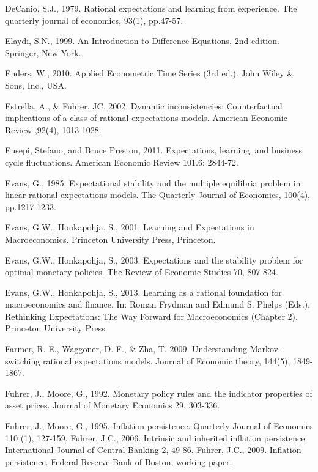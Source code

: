 \begin{thebibliography}{}
\bibitem{} DeCanio, S.J., 1979. Rational expectations and learning from experience. The quarterly journal of economics, 93(1), pp.47-57.

 Elaydi, S.N., 1999. An Introduction to Difference
Equations, 2nd edition. Springer, New York.

Enders, W., 2010. Applied Econometric Time Series (3rd ed.). John Wiley \& Sons, Inc., USA.

 Estrella, A., \& Fuhrer, JC, 2002.
Dynamic inconsistencies: Counterfactual implications of a class of rational-expectations models. 
{American Economic Review} ,92(4), 1013-1028.

 Eusepi, Stefano, and Bruce Preston, 2011.
Expectations, learning, and business cycle fluctuations. {American Economic Review} 101.6: 2844-72.

\bibitem{} Evans, G., 1985. Expectational stability and the multiple equilibria problem in linear rational expectations models. The Quarterly Journal of Economics, 100(4), pp.1217-1233.

Evans, G.W., Honkapohja, S., 2001. Learning and Expectations in Macroeconomics. Princeton University Press, Princeton.


\bibitem{}Evans, G.W., Honkapohja, S., 2003. Expectations and the stability problem for optimal monetary policies. The Review of
Economic Studies 70, 807-824.

Evans, G.W., Honkapohja, S., 2013. Learning as a rational foundation for macroeconomics and finance.
In: Roman Frydman and Edmund S. Phelps (Eds.), Rethinking Expectations: The Way Forward for
Macroeconomics (Chapter 2). Princeton
University Press.

\bibitem{} Farmer, R. E., Waggoner, D. F., \& Zha, T. 2009. Understanding Markov-switching rational expectations models. Journal of Economic theory, 144(5), 1849-1867.

\bibitem{} Fuhrer, J., Moore, G., 1992. Monetary policy rules
and the indicator properties of asset prices. Journal of Monetary
Economics 29, 303-336.

 Fuhrer, J., Moore, G., 1995. Inflation persistence. Quarterly
Journal of Economics 110 (1), 127-159.
%
Fuhrer, J.C., 2006. Intrinsic and inherited inflation persistence. International Journal of Central Banking 2, 49-86.
%
Fuhrer, J.C., 2009. Inflation persistence. Federal Reserve Bank of Boston, working
paper.




\end{thebibliography}
